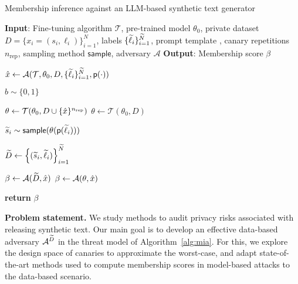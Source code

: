 \begin{algorithm*}[t!]
\caption{Membership inference against an LLM-based synthetic text generator}
\label{alg:mia}
\begin{algorithmic}[1]
\STATE \textbf{Input}: Fine-tuning algorithm $\mathcal{T}$, pre-trained model $\theta_0$, private dataset $D = \{ x_i = (s_i, \ell_i) \}_{i=1}^N$, labels $\{{\widetilde{\ell}}_i\}_{i=1}^{{\widetilde{N}}}$, prompt template \prompt{\cdot}, canary repetitions $n_\text{rep}$, sampling method $\textsf{sample}$, adversary $\mathcal{A}$
\STATE \textbf{Output}: Membership score $\beta$

\STATE ${\hat{x}} \gets \mathcal{A}(\mathcal{T}, \theta_0, D, \{{\widetilde{\ell}}_i\}_{i=1}^{{\widetilde{N}}}, {\textsf{p}(\cdot)})$ 
\hfill {}

\STATE $b \sim \{0,1\}$ 
\hfill {}

    \STATE $\theta \gets \mathcal{T}(\theta_0, D \cup \{{\hat{x}}\}^{n_\textrm{rep}})$
    \hfill {}
\ELSE
    \STATE $\theta \gets \mathcal{T}(\theta_0, D)$
    \hfill {}
\ENDIF

    \STATE ${\widetilde{s}}_i \sim \textsf{sample}(\theta({\textsf{p}({\widetilde{\ell}}_i)}))$
    \hfill {}
\ENDFOR

\STATE ${\widetilde{D}} \gets \left\{ ({\widetilde{s}}_i, {\widetilde{\ell}}_i) \right\}_{i=1}^{\widetilde{N}}$

    \STATE $\beta \gets \mathcal{A}({\widetilde{D}}, {\hat{x}})$
    \hfill {}
\ELSE
    \STATE $\beta \gets \mathcal{A}(\theta, {\hat{x}})$ 
    \hfill {}
\ENDIF

\STATE \textbf{return} $\beta$
\end{algorithmic}
\end{algorithm*}

\textbf{Problem statement.} 
We study methods to audit privacy risks associated with releasing synthetic text. Our main goal is to develop an effective data-based adversary $\mathcal{A}^{{\widetilde{D}}}$ in the threat model of Algorithm~\ref{alg:mia}. For this, we explore the design space of canaries to approximate the worst-case, and adapt state-of-the-art methods used to compute membership scores in model-based attacks to the data-based scenario.
